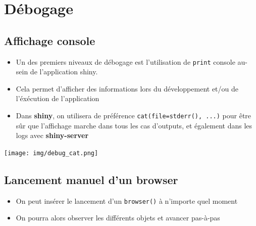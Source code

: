 \documentclass[
]{article}
\newenvironment{Shaded}{\begin{snugshade}}{\end{snugshade}}
\newcommand{\AttributeTok}[1]{\textcolor[rgb]{0.13,0.29,0.53}{#1}}
\newcommand{\CommentTok}[1]{\textcolor[rgb]{0.56,0.35,0.01}{\textit{#1}}}
\newcommand{\FunctionTok}[1]{\textcolor[rgb]{0.13,0.29,0.53}{\textbf{#1}}}
\newcommand{\NormalTok}[1]{#1}
\newcommand{\OtherTok}[1]{\textcolor[rgb]{0.56,0.35,0.01}{#1}}
\newcommand{\SpecialCharTok}[1]{\textcolor[rgb]{0.81,0.36,0.00}{\textbf{#1}}}
\providecommand{\tightlist}{%
  \setlength{\itemsep}{0pt}\setlength{\parskip}{0pt}}
\begin{document}
\hypertarget{duxe9bogage}{%
\section{Débogage}\label{duxe9bogage}}

\hypertarget{affichage-console}{%
\subsection{Affichage console}\label{affichage-console}}

\begin{itemize}
\tightlist
\item
  Un des premiers niveaux de débogage est l'utilisation de
  \texttt{print} console au-sein de l'application shiny.
\item
  Cela permet d'afficher des informations lors du développement et/ou de
  l'éxécution de l'application
\item
  Dans \textbf{shiny}, on utilisera de préférence
  \texttt{cat(file=stderr(),\ ...)} pour être sûr que l'affichage marche
  dans tous les cas d'outputs, et également dans les logs avec
  \textbf{shiny-server}
\end{itemize}

\begin{Shaded}
\end{Shaded}

\texttt{[image: img/debug\_cat.png]}

\hypertarget{lancement-manuel-dun-browser}{%
\subsection{Lancement manuel d'un
browser}\label{lancement-manuel-dun-browser}}

\begin{itemize}
\tightlist
\item
  On peut insérer le lancement d'un \texttt{browser()} à n'importe quel
  moment
\item
  On pourra alors observer les différents objets et avancer pas-à-pas
\end{itemize}
\end{document}
